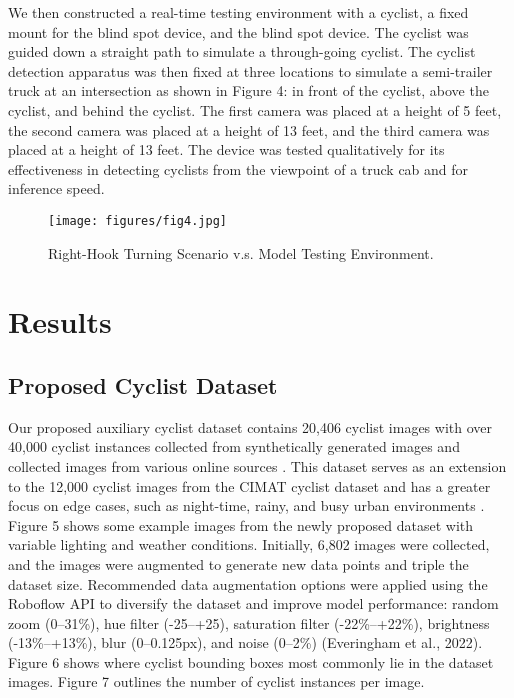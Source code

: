 \documentclass{article}
\begin{document}
We then constructed a real-time testing environment with a cyclist, a fixed mount for the blind spot device, and the blind spot device. The cyclist was guided down a straight path to simulate a through-going cyclist. The cyclist detection apparatus was then fixed at three locations to simulate a semi-trailer truck at an intersection as shown in Figure 4: in front of the cyclist, above the cyclist, and behind the cyclist. The first camera was placed at a height of 5 feet, the second camera was placed at a height of 13 feet, and the third camera was placed at a height of 13 feet. The device was tested qualitatively for its effectiveness in detecting cyclists from the viewpoint of a truck cab and for inference speed. 

\begin{figure}[t]
\centering
\texttt{[image: figures/fig4.jpg]}
\caption{Right-Hook Turning Scenario v.s. Model Testing Environment.}
\label{fig:fig4}
\end{figure}

\section{Results}
\subsection{Proposed Cyclist Dataset}
Our proposed auxiliary cyclist dataset contains 20,406 cyclist images with over 40,000 cyclist instances collected from synthetically generated images and collected images from various online sources \cite{thomas_open_2021}. This dataset serves as an extension to the 12,000 cyclist images from the CIMAT cyclist dataset and has a greater focus on edge cases, such as night-time, rainy, and busy urban environments \cite{thomas_open_2021}. Figure 5 shows some example images from the newly proposed dataset with variable lighting and weather conditions. Initially, 6,802 images were collected, and the images were augmented to generate new data points and triple the dataset size. Recommended data augmentation options were applied using the Roboflow API to diversify the dataset and improve model performance: random zoom (0–31\%), hue filter (-25–+25), saturation filter (-22\%–+22\%), brightness (-13\%–+13\%), blur (0–0.125px), and noise (0–2\%) (Everingham et al., 2022). Figure 6 shows where cyclist bounding boxes most commonly lie in the dataset images. Figure 7 outlines the number of cyclist instances per image. 
\end{document}
